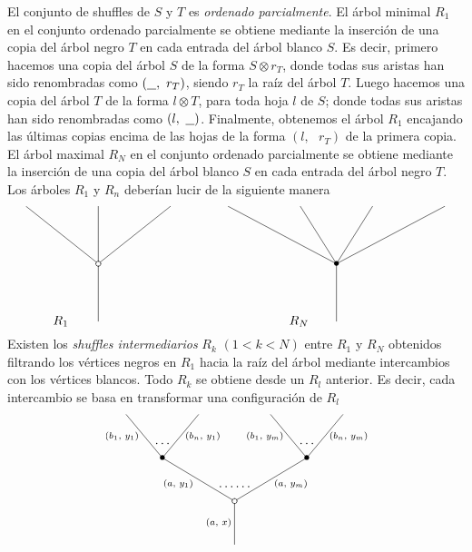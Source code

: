 \documentclass[../main.tex]{subfiles}
\begin{document}
El conjunto de shuffles de $S$ y $T$ es \emph{ordenado parcialmente}. El \'arbol minimal $R_1$ en el conjunto ordenado parcialmente se obtiene mediante la inserci\'on de una copia del \'arbol negro $T$ en cada entrada del \'arbol blanco $S$.
Es decir, primero hacemos una copia del \'arbol $S$ de la forma $S\otimes r_T$, donde todas sus aristas han sido renombradas como $(\underline{\hspace{.25cm}},\text{ }r_T)$, siendo $r_T$ la ra\'iz del \'arbol $T$.
Luego hacemos una copia del \'arbol $T$ de la forma $l\otimes T$, para toda hoja $l$ de $S$; donde todas sus aristas han sido renombradas como $(l,\text{ }\underline{\hspace{.25cm}})$.
Finalmente, obtenemos el \'arbol $R_1$ encajando las \'ultimas copias encima de las hojas de la forma $(l,\text{ }r_T)$ de la primera copia.
El \'arbol maximal $R_N$ en el conjunto ordenado parcialmente se obtiene mediante la inserci\'on de una copia del \'arbol blanco $S$ en cada entrada del \'arbol negro $T$.
Los \'arboles $R_1$ y $R_n$ deber\'ian lucir de la siguiente manera
$$
    \xy
    <0.08cm, 0cm>:
    (0.0, 0.0)*{}="1"; %
    (0.0, 20.0)*\cir<2pt>{}="2"; %
    (-25.0, 40.0)*{}="3"; %
    (0.0, 40.0)*{}="4"; %
    (25.0, 40.0)*{}="5"; %
    "1";"2" **\dir{-};
    "2";"3" **\dir{-};
    "2";"4" **\dir{-};
    "2";"5" **\dir{-};
    (-13,0)*{R_1};
    \endxy
    \xy
    <0.08cm, 0cm>:
    (-10, 0.0)*{}="1";
    (10, 10.0)*{}="2";
    \endxy
    \xy
    <0.08cm, 0cm>:
    (0.0, 0.0)*{}="1"; %
    (0.0, 20.0)*=0{\bullet}="2"; %
    (-37.5, 40.0)*{}="3"; %
    (-12.5, 40.0)*{}="4"; %
    (12.5, 40.0)*{}="5"; %
    (37.5, 40.0)*{}="6"; %
    "1";"2" **\dir{-};
    "2";"3" **\dir{-};
    "2";"4" **\dir{-};
    "2";"5" **\dir{-};
    "2";"6" **\dir{-};
    (-13,0)*{R_N};
    \endxy
$$
Existen los \emph{shuffles intermediarios} $R_k$ $(1 < k < N)$ entre $R_1$ y $R_N$ obtenidos filtrando los v\'ertices negros en $R_1$ hacia la ra\'iz del \'arbol mediante intercambios con los v\'ertices blancos.
Todo $R_k$ se obtiene desde un $R_l$ anterior. Es decir, cada intercambio se basa en transformar una configuraci\'on de $R_l$
\begin{equation}
    \xy
    <0.08cm, 0cm>:
    (0.0, 0.0)*{}="1"; %
    (0.0, 15.0)*\cir<2pt>{}="2"; %
    (-25.0, 30.0)*=0{\bullet}="3"; %
    (-37.5, 45.0)*{}="4"; %
    (-12.5, 45.0)*{}="5"; %
    (25.0, 30.0)*=0{\bullet}="6"; %
    (12.5, 45.0)*{}="7"; %
    (37.5, 45.0)*{}="8"; %
    "1";"2" **\dir{-};
    "2";"3" **\dir{-};
    "3";"4" **\dir{-};
    "3";"5" **\dir{-};
    "2";"6" **\dir{-};
    "6";"7" **\dir{-};
    "6";"8" **\dir{-};
    (-5.5, 7.5)*=0{\scriptstyle (a,\text{ }x)};
    (-19.5, 21)*=0{\scriptstyle (a,\text{ }y_1)};
    (-39, 37.5)*=0{\scriptstyle (b_1,\text{ }y_1)};
    (-11, 37.5)*=0{\scriptstyle (b_n,\text{ }y_1)};
    (19.5, 21)*=0{\scriptstyle (a,\text{ }y_m)};
    (10.5, 37.5)*=0{\scriptstyle (b_1,\text{ }y_m)};
    (39.5, 37.5)*=0{\scriptstyle (b_n,\text{ }y_m)};
    (-25,35)*{\dots};
    (25,35)*{\dots};
    (0,20)*{\dots\dots};
    \endxy
\end{equation}
\end{document}
